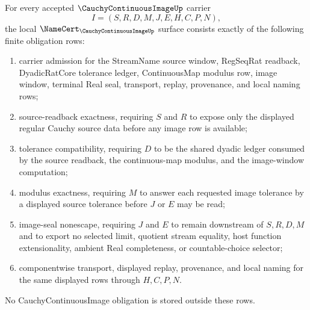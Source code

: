 \begin{theorem}
\label{thm:cauchy-continuous-image-namecert-obligations}
For every accepted $\CauchyContinuousImageUp$ carrier
$$
I=(S,R,D,M,J,E,H,C,P,N),
$$
the local $\NameCert_{\CauchyContinuousImageUp}$ surface consists exactly of the following finite obligation rows:
\begin{enumerate}
\item carrier admission for the StreamName source window, RegSeqRat readback, DyadicRatCore tolerance ledger, ContinuousMap modulus row, image window, terminal Real seal, transport, replay, provenance, and local naming rows;
\item source-readback exactness, requiring $S$ and $R$ to expose only the displayed regular Cauchy source data before any image row is available;
\item tolerance compatibility, requiring $D$ to be the shared dyadic ledger consumed by the source readback, the continuous-map modulus, and the image-window computation;
\item modulus exactness, requiring $M$ to answer each requested image tolerance by a displayed source tolerance before $J$ or $E$ may be read;
\item image-seal nonescape, requiring $J$ and $E$ to remain downstream of $S,R,D,M$ and to export no selected limit, quotient stream equality, host function extensionality, ambient Real completeness, or countable-choice selector;
\item componentwise transport, displayed replay, provenance, and local naming for the same displayed rows through $H,C,P,N$.
\end{enumerate}
No CauchyContinuousImage obligation is stored outside these rows.
\end{theorem}
